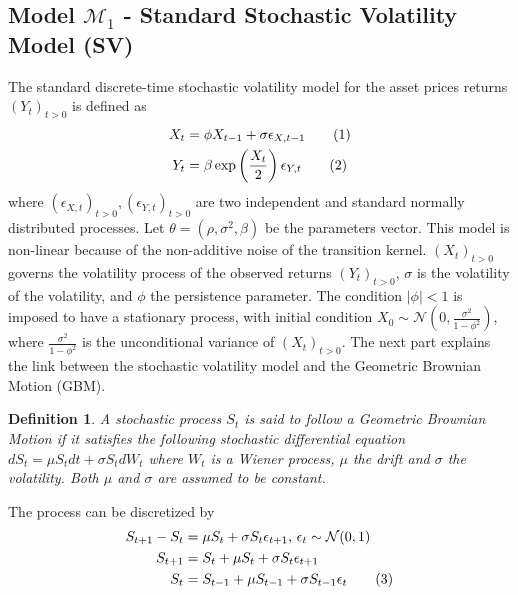 \documentclass[11pt,a4,twosided,singlespacing,titlepagenumber=on]{scrreprt}
\numberwithin{equation}{chapter} %
\newtheorem{definition}[theorem]{Definition}%
\theoremstyle{remark}
\newcommand\numberthis{\addtocounter{equation}{1}\tag{\theequation}}
\begin{document}
\subsection{Model $\mathcal{M}_1$ - Standard Stochastic Volatility Model (SV)}
The standard discrete-time stochastic volatility model for the asset prices returns $(Y_t)_{t>0}$ is defined as
\begin{align*}
  X_t &=  \phi X_{t-1} + \sigma \epsilon_{X,t-1} \numberthis \label{std_SV_process_X} \\
  Y_t &=  \beta \exp \left( \frac{X_t}{2} \right) \epsilon_{Y,t} \numberthis
\end{align*}
where $(\epsilon_{X,t})_{t>0},(\epsilon_{Y,t})_{t>0}$ are two independent and standard normally distributed processes. Let $\theta = (\rho, \sigma^2, \beta)$ be the parameters vector. This model is non-linear because of the non-additive noise of the transition kernel. $(X_t)_{t>0}$ governs the volatility process of the observed returns $(Y_t)_{t>0}$, $\sigma$ is the volatility of the volatility, and $\phi$ the persistence parameter. The condition $|\phi| < 1$  is imposed to have a stationary process, with initial condition $X_0 \sim \mathcal{N} \left(0, \frac{\sigma^2}{1-\phi^2} \right)$, where $\frac{\sigma^2}{1-\phi^2}$ is the unconditional variance of $(X_t)_{t>0}$. The next part explains the link between the stochastic volatility model and the Geometric Brownian Motion (GBM).

\begin{definition}
\textit{
A stochastic process $S_t$ is said to follow a Geometric Brownian Motion if it satisfies the following stochastic differential equation
$dS_t = \mu S_t dt + \sigma S_t dW_t$
where $W_t$ is a Wiener process, $\mu$ the drift and $\sigma$ the volatility. Both $\mu$ and $\sigma$ are assumed to be constant.}
\end{definition}

The process can be discretized by
\begin{align*}
S_{t+1}-S_t &= \mu S_t + \sigma S_t \epsilon_{t+1} \text{, } \epsilon_{t} \sim \mathcal{N}(0,1) \\
S_{t+1} 	&= S_t + \mu S_t + \sigma S_t \epsilon_{t+1} \\
S_t 	&= S_{t-1} + \mu S_{t-1} + \sigma S_{t-1} \epsilon_t \numberthis
\end{align*}
\end{document}
